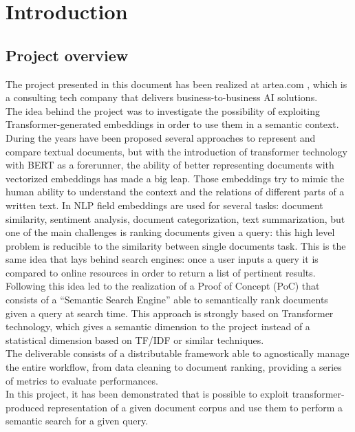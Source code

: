 \documentclass[\main/main.tex]{subfiles}
\begin{document}
\chapter*{Introduction}
\section*{Project overview}
The project presented in this document has been realized at artea.com \cite{artea}, which is a consulting tech company that delivers business-to-business AI solutions. \\
The idea behind the project was to investigate the possibility of exploiting Transformer-generated embeddings in order to use them in a semantic context. During the years have been proposed several approaches to represent and compare textual documents, but with the introduction of transformer technology with BERT as a forerunner, the ability of better representing documents with vectorized embeddings has made a big leap. Those embeddings try to mimic the human ability to understand the context and the relations of different parts of a written text. In NLP field embeddings are used for several tasks: document similarity, sentiment analysis, document categorization, text summarization, but one of the main challenges is ranking documents given a query: this high level problem is reducible to the similarity between single documents task. This is the same idea that lays behind search engines: once a user inputs a query it is compared to online resources in order to return a list of pertinent results. \\
Following this idea led to the realization of a Proof of Concept (PoC) that consists of a ``Semantic Search Engine'' able to semantically rank documents given a query at search time. This approach is strongly based on Transformer technology, which gives a semantic dimension to the project instead of a statistical dimension based on TF/IDF or similar techniques. \\
The deliverable consists of a distributable framework able to agnostically manage the entire workflow, from data cleaning to document ranking, providing a series of metrics to evaluate performances. \\
In this project, it has been demonstrated that is possible to exploit transformer-produced representation of a given document corpus and use them to perform a semantic search for a given query.
\end{document}
